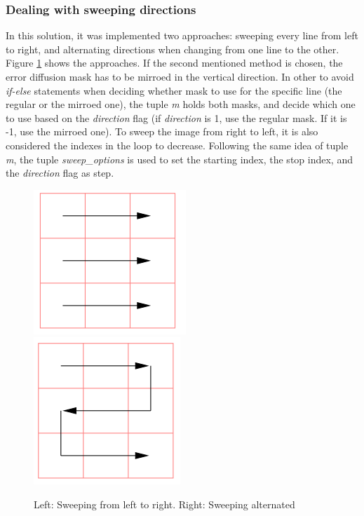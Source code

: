 \documentclass[]{IEEEtran}
\begin{document}
\subsubsection{Dealing with sweeping directions}
In this solution, it was implemented two approaches: sweeping every line from left to right, and alternating directions when changing from one line to the other. Figure \ref{fig:sweepingmodes} shows the approaches. If the second mentioned method is chosen, the error diffusion mask has to be mirroed in the vertical direction. In other to avoid \textit{if-else} statements when deciding whether mask to use for the specific line (the regular or the mirroed one), the tuple \textit{m} holds both masks, and decide which one to use based on the \textit{direction} flag (if \textit{direction} is 1, use the regular mask. If it is -1, use the mirroed one). To sweep the image from right to left, it is also considered the indexes in the loop to decrease. Following the same idea of tuple \textit{m}, the tuple \textit{sweep\_options} is used to set the starting index, the stop index, and the \textit{direction} flag as step.

\begin{figure}[H]
  \centering
  \includegraphics[width=0.4\hsize]{images/sw-left-to-right.png}
  \includegraphics[width=0.4\hsize]{images/sw-alternate.png}
  \caption{Left: Sweeping from left to right. Right: Sweeping alternated}
  \label{fig:sweepingmodes}
\end{figure}
\end{document}
